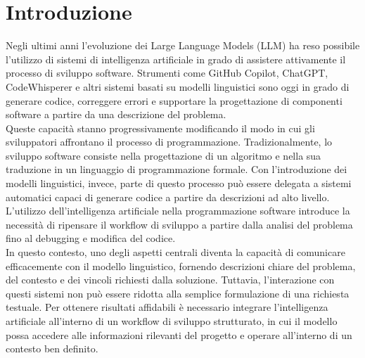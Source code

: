\chapter{Introduzione}
Negli ultimi anni l’evoluzione dei Large Language Models (LLM) ha reso possibile l’utilizzo di sistemi di intelligenza artificiale in grado di assistere attivamente il processo di sviluppo software. Strumenti come GitHub Copilot, ChatGPT, CodeWhisperer e altri sistemi basati su modelli linguistici sono oggi in grado di generare codice, correggere errori e supportare la progettazione di componenti software a partire da una descrizione del problema.
\\
Queste capacità stanno progressivamente modificando il modo in cui gli sviluppatori affrontano il processo di programmazione. Tradizionalmente, lo sviluppo software consiste nella progettazione di un algoritmo e nella sua traduzione in un linguaggio di programmazione formale. Con l’introduzione dei modelli linguistici, invece, parte di questo processo può essere delegata a sistemi automatici capaci di generare codice a partire da descrizioni ad alto livello. L’utilizzo dell’intelligenza artificiale nella programmazione software introduce la necessità di ripensare il workflow di sviluppo a partire dalla analisi del problema fino al debugging e modifica del codice.
\\
In questo contesto, uno degli aspetti centrali diventa la capacità di comunicare efficacemente con il modello linguistico, fornendo descrizioni chiare del problema, del contesto e dei vincoli richiesti dalla soluzione. Tuttavia, l'interazione con questi sistemi non può essere ridotta alla semplice formulazione di una richiesta testuale. Per ottenere risultati affidabili è necessario integrare l'intelligenza artificiale all'interno di un workflow di sviluppo strutturato, in cui il modello possa accedere alle informazioni rilevanti del progetto e operare all'interno di un contesto ben definito.
\\ 
